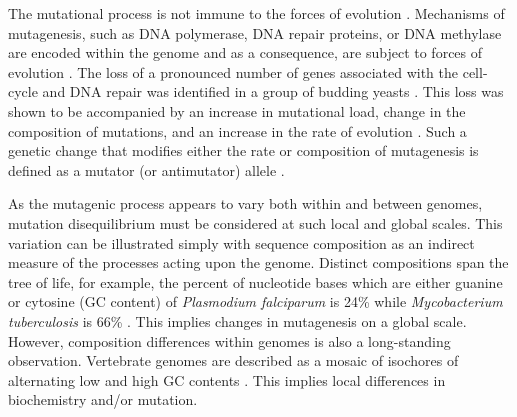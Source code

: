 The mutational process is not immune to the forces of evolution \citep{Lynch2016GeneticRate}. Mechanisms of mutagenesis, such as DNA polymerase, DNA repair proteins, or DNA methylase are encoded within the genome and as a consequence, are subject to forces of evolution \citep{Lynch2010EvolutionRate}. The loss of a pronounced number of genes associated with the cell-cycle and DNA repair was identified in a group of budding yeasts \citep{Steenwyk2019ExtensiveYeasts}. This loss was shown to be accompanied by an increase in mutational load, change in the composition of mutations, and an increase in the rate of evolution \citep{Steenwyk2019ExtensiveYeasts}. Such a genetic change that modifies either the rate or composition of mutagenesis is defined as a mutator (or antimutator) allele \citep{Lynch2016GeneticRate}.

As the mutagenic process appears to vary both within and between genomes, mutation disequilibrium must be considered at such local and global scales. This variation can be illustrated simply with sequence composition as an indirect measure of the processes acting upon the genome. Distinct compositions span the tree of life, for example, the percent of nucleotide bases which are either guanine or cytosine (GC content) of \textit{Plasmodium falciparum} is 24\% while \textit{Mycobacterium tuberculosis} is  66\% \citep{Nakamura2000Codon2000}. This implies changes in mutagenesis on a global scale. However, composition differences within genomes is also a long-standing observation. Vertebrate genomes are described as a mosaic of isochores of alternating low and high GC contents \citep{Bernardi1989TheGenome, Bernardi2000IsochoresVertebrates}. This implies local differences in biochemistry and/or mutation. 

